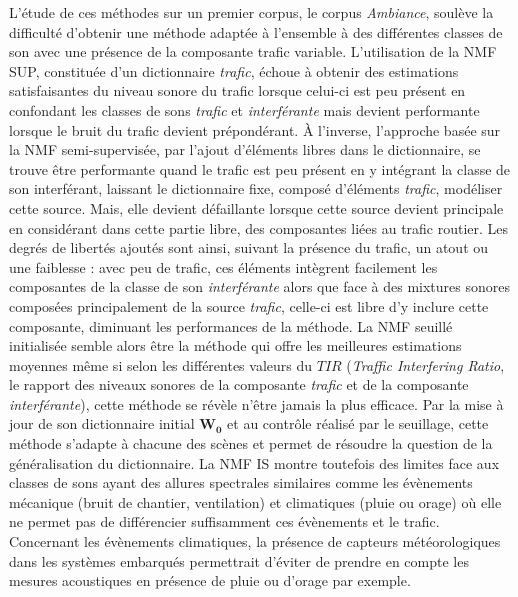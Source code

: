 L'étude de ces méthodes sur un premier corpus, le corpus \textit{Ambiance}, soulève la difficulté d'obtenir une méthode adaptée à l'ensemble à des différentes classes de son avec une présence de la composante trafic variable. 
L'utilisation de la NMF SUP, constituée d'un dictionnaire \textit{trafic}, échoue à obtenir des estimations satisfaisantes du niveau sonore du trafic lorsque celui-ci est peu présent en confondant les classes de sons \textit{trafic} et \textit{interférante} mais devient performante lorsque le bruit du trafic devient prépondérant. 
À l'inverse, l'approche basée sur la NMF semi-supervisée, par l'ajout d'éléments libres dans le dictionnaire, se trouve être performante quand le trafic est peu présent en y intégrant la classe de son interférant, laissant le dictionnaire fixe, composé d'éléments \textit{trafic}, modéliser cette source. 
Mais, elle devient défaillante lorsque cette source devient principale en considérant dans cette partie libre, des composantes liées au trafic routier. Les degrés de libertés ajoutés sont ainsi, suivant la présence du trafic, un atout ou une faiblesse : avec peu de trafic, ces éléments intègrent facilement les composantes de la classe de son \textit{interférante} alors que face à des mixtures sonores composées principalement de la source \textit{trafic}, celle-ci est libre d'y inclure cette composante, diminuant les performances de la méthode.
La NMF seuillé initialisée semble alors être la méthode qui offre les meilleures estimations moyennes même si selon les différentes valeurs du $TIR$ (\textit{Traffic Interfering Ratio}, le rapport des niveaux sonores de la composante \textit{trafic} et de la composante \textit{interférante}), cette méthode se révèle n'être jamais la plus efficace. Par la mise à jour de son dictionnaire initial $\mathbf{W_0}$ et au contrôle réalisé par le seuillage, cette méthode s'adapte à chacune des scènes et permet de résoudre la question de la généralisation du dictionnaire. La NMF IS montre toutefois des limites face aux classes de sons ayant des allures spectrales similaires comme les évènements mécanique (bruit de chantier, ventilation) et climatiques (pluie ou orage) où elle ne permet pas de différencier suffisamment ces évènements et le trafic. Concernant les évènements climatiques, la présence de capteurs météorologiques dans les systèmes embarqués permettrait d'éviter de prendre en compte les mesures acoustiques en présence de pluie ou d'orage par exemple.

